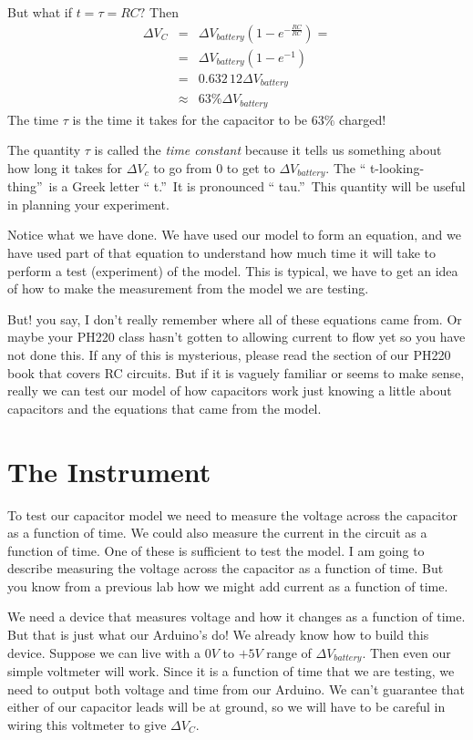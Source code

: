 But what if $t=\tau =RC?$ Then 
\begin{eqnarray*}
\Delta V_{C} &=&\Delta V_{battery}\left( 1-e^{-\frac{RC}{RC}}\right) = \\
&=&\Delta V_{battery}\left( 1-e^{-1}\right) \\
&=&\allowbreak 0.632\,12\Delta V_{battery} \\
&\approx &63\%\Delta V_{battery}
\end{eqnarray*}%
The time $\tau $ is the time it takes for the capacitor to be $63\%$ charged!

The quantity $\tau $ is called the \emph{time constant} because it tells us
something about how long it takes for $\Delta V_{c}$ to go from $0$ to get
to $\Delta V_{battery}.$ The \textquotedblleft
t-looking-thing\textquotedblright\ is a Greek letter \textquotedblleft
t.\textquotedblright\ It is pronounced \textquotedblleft
tau.\textquotedblright\ This quantity will be useful in planning your
experiment.

Notice what we have done. We have used our model to form an equation, and we
have used part of that equation to understand how much time it will take to
perform a test (experiment) of the model. This is typical, we have to get an
idea of how to make the measurement from the model we are testing.

But! you say, I don't really remember where all of these equations came
from. Or maybe your PH220 class hasn't gotten to allowing current to flow
yet so you have not done this. If any of this is mysterious, please read the
section of our PH220 book that covers RC circuits. But if it is vaguely
familiar or seems to make sense, really we can test our model of how
capacitors work just knowing a little about capacitors and the equations
that came from the model.

\section{The Instrument}

To test our capacitor model we need to measure the voltage across the
capacitor as a function of time. We could also measure the current in the
circuit as a function of time. One of these is sufficient to test the model.
I am going to describe measuring the voltage across the capacitor as a
function of time. But you know from a previous lab how we might add current
as a function of time.

We need a device that measures voltage and how it changes as a function of
time. But that is just what our Arduino's do! We already know how to build
this device. Suppose we can live with a $0\unit{V}$ to $+5\unit{V}$ range of 
$\Delta V_{battery}.$ Then even our simple voltmeter will work. Since it is
a function of time that we are testing, we need to output both voltage and
time from our Arduino. We can't guarantee that either of our capacitor leads
will be at ground, so we will have to be careful in wiring this voltmeter to
give $\Delta V_{C}.$

